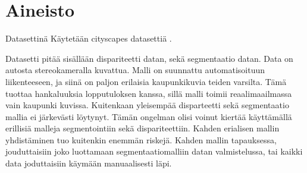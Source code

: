 \chapter{Aineisto}%
\label{ch:aineisto}

Datasettinä Käytetään cityscapes datasettiä \cite{Cordts2016Cityscapes}.


Datasetti pitää sisällään dispariteetti datan, sekä segmentaatio datan. Data on autosta stereokameralla kuvattua. Malli on suunnattu automatisoituun liikenteeseen, ja siinä on paljon erilaisia kaupunkikuvia teiden varsilta.
Tämä tuottaa hankaluuksia lopputuloksen kanssa, sillä malli toimii reaalimaailmassa vain kaupunki kuvissa. Kuitenkaan yleisempää disparteetti sekä segmentaatio mallia ei järkevästi löytynyt. 
Tämän ongelman olisi voinut kiertää käyttämällä erillisiä malleja segmentointiin sekä dispariteettiin. 
Kahden erialisen mallin yhdistäminen tuo kuitenkin enemmän riskejä.
Kahden mallin tapauksessa, jouduttaisiin joko luottamaan segmentaatiomalliin datan valmistelussa, tai kaikki data joduttaisiin käymään manuaalisesti läpi.
